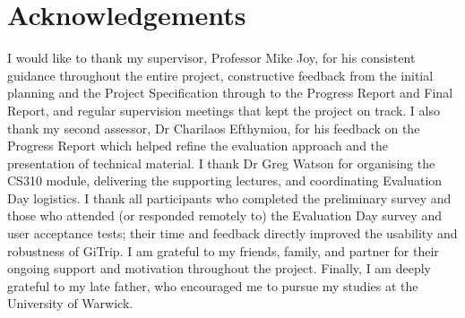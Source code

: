 \chapter*{Acknowledgements}

I would like to thank my supervisor, Professor Mike Joy, for his consistent
guidance throughout the entire project, constructive feedback from the initial
planning and the Project Specification through to the Progress Report and Final
Report, and regular supervision meetings that kept the project on track. I also thank my second assessor,
Dr Charilaos Efthymiou, for his feedback on the Progress Report which helped
refine the evaluation approach and the presentation of technical material. I
thank Dr Greg Watson for organising the CS310 module, delivering the supporting
lectures, and coordinating Evaluation Day logistics. I thank all participants
who completed the preliminary survey and those who attended (or responded
remotely to) the Evaluation Day survey and user acceptance tests; their time and
feedback directly improved the usability and robustness of GiTrip. I am
grateful to my friends, family, and partner for their ongoing support and
motivation throughout the project. Finally, I am deeply grateful
to my late father, who encouraged me to pursue my studies at the University of
Warwick.